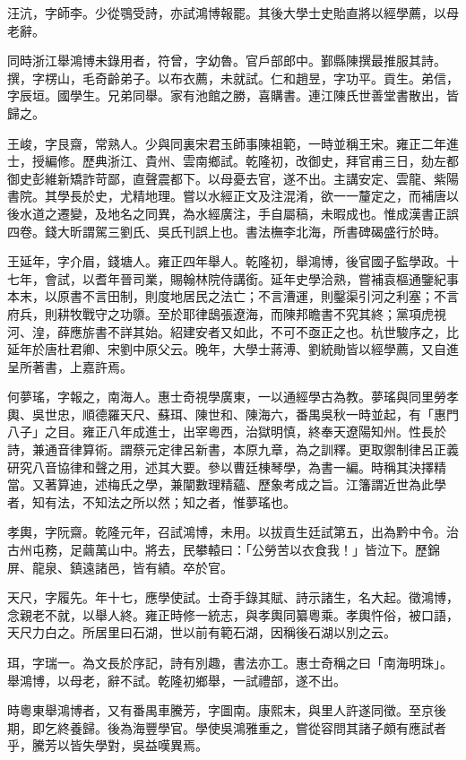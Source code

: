 \begin{pinyinscope}
汪沆，字師李。少從鶚受詩，亦試鴻博報罷。其後大學士史貽直將以經學薦，以母老辭。

同時浙江舉鴻博未錄用者，符曾，字幼魯。官戶部郎中。鄞縣陳撰最推服其詩。撰，字楞山，毛奇齡弟子。以布衣薦，未就試。仁和趙昱，字功平。貢生。弟信，字辰垣。國學生。兄弟同舉。家有池館之勝，喜購書。連江陳氏世善堂書散出，皆歸之。

王峻，字艮齋，常熟人。少與同裏宋君玉師事陳祖範，一時並稱王宋。雍正二年進士，授編修。歷典浙江、貴州、雲南鄉試。乾隆初，改御史，拜官甫三日，劾左都御史彭維新矯詐苛鄙，直聲震都下。以母憂去官，遂不出。主講安定、雲龍、紫陽書院。其學長於史，尤精地理。嘗以水經正文及注混淆，欲一一釐定之，而補唐以後水道之遷變，及地名之同異，為水經廣注，手自屬稿，未暇成也。惟成漢書正誤四卷。錢大昕謂駕三劉氏、吳氏刊誤上也。書法橅李北海，所書碑碣盛行於時。

王延年，字介眉，錢塘人。雍正四年舉人。乾隆初，舉鴻博，後官國子監學政。十七年，會試，以耆年晉司業，賜翰林院侍講銜。延年史學洽熟，嘗補袁樞通鑒紀事本末，以原書不言田制，則度地居民之法亡；不言漕運，則鑿渠引河之利塞；不言府兵，則耕牧戰守之功隳。至於耶律鴟張遼海，而陳邦瞻書不究其終；黨項虎視河、湟，薛應旂書不詳其始。紹建安者又如此，不可不亟正之也。杭世駿序之，比延年於唐杜君卿、宋劉中原父云。晚年，大學士蔣溥、劉統勛皆以經學薦，又自進呈所著書，上嘉許焉。

何夢瑤，字報之，南海人。惠士奇視學廣東，一以通經學古為教。夢瑤與同里勞孝輿、吳世忠，順德羅天尺、蘇珥、陳世和、陳海六，番禺吳秋一時並起，有「惠門八子」之目。雍正八年成進士，出宰粵西，治獄明慎，終奉天遼陽知州。性長於詩，兼通音律算術。謂蔡元定律呂新書，本原九章，為之訓釋。更取禦制律呂正義研究八音協律和聲之用，述其大要。參以曹廷棟琴學，為書一編。時稱其決擇精當。又著算迪，述梅氏之學，兼闡數理精蘊、歷象考成之旨。江籓謂近世為此學者，知有法，不知法之所以然；知之者，惟夢瑤也。

孝輿，字阮齋。乾隆元年，召試鴻博，未用。以拔貢生廷試第五，出為黔中令。治古州屯務，足繭萬山中。將去，民攀轅曰：「公勞苦以衣食我！」皆泣下。歷錦屏、龍泉、鎮遠諸邑，皆有績。卒於官。

天尺，字履先。年十七，應學使試。士奇手錄其賦、詩示諸生，名大起。徵鴻博，念親老不就，以舉人終。雍正時修一統志，與孝輿同纂粵乘。孝輿忤俗，被口語，天尺力白之。所居里曰石湖，世以前有範石湖，因稱後石湖以別之云。

珥，字瑞一。為文長於序記，詩有別趣，書法亦工。惠士奇稱之曰「南海明珠」。舉鴻博，以母老，辭不試。乾隆初鄉舉，一試禮部，遂不出。

時粵東舉鴻博者，又有番禺車騰芳，字圖南。康熙末，與里人許遂同徵。至京後期，即乞終養歸。後為海豐學官。學使吳鴻雅重之，嘗從容問其諸子頗有應試者乎，騰芳以皆失學對，吳益嘆異焉。


\end{pinyinscope}
